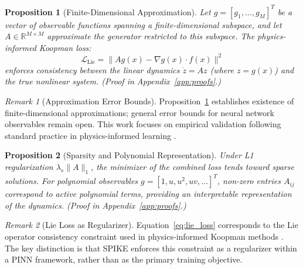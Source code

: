 \documentclass{article}
\newtheorem{proposition}{Proposition}
\theoremstyle{remark}
\newtheorem{remark}{Remark}
\begin{document}
\begin{proposition}[Finite-Dimensional Approximation]
\label{prop:finite_dim}
Let $g = [g_1, \ldots, g_M]^T$ be a vector of observable functions spanning a finite-dimensional subspace, and let $A \in \mathbb{R}^{M \times M}$ approximate the generator restricted to this subspace. The physics-informed Koopman loss:
\begin{equation}
\mathcal{L}_{\text{Lie}} = \|Ag(x) - \nabla g(x) \cdot f(x)\|^2
\label{eq:lie_loss}
\end{equation}
enforces consistency between the linear dynamics $\dot{z} = Az$ (where $z = g(x)$) and the true nonlinear system. (Proof in Appendix~\ref{app:proofs}.)
\end{proposition}

\begin{remark}[Approximation Error Bounds]
Proposition~\ref{prop:finite_dim} establishes existence of finite-dimensional approximations; general error bounds for neural network observables remain open. This work focuses on empirical validation following standard practice in physics-informed learning \citep{raissi2019pinn}.
\end{remark}

\begin{proposition}[Sparsity and Polynomial Representation]
\label{prop:sparsity}
Under L1 regularization $\lambda_s\|A\|_1$, the minimizer of the combined loss tends toward sparse solutions. For polynomial observables $g = [1, u, u^2, uv, \ldots]^T$, non-zero entries $A_{ij}$ correspond to active polynomial terms, providing an interpretable representation of the dynamics. (Proof in Appendix~\ref{app:proofs}.)
\end{proposition}

\begin{remark}[Lie Loss as Regularizer]
Equation~\ref{eq:lie_loss} corresponds to the Lie operator consistency constraint used in physics-informed Koopman methods \citep{liu2022physicskoopman}. The key distinction is that SPIKE enforces this constraint as a regularizer within a PINN framework, rather than as the primary training objective.
\end{remark}
\end{document}
